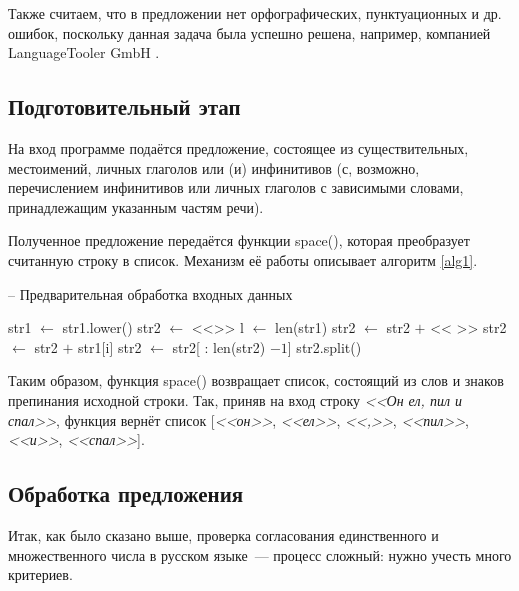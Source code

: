 \documentclass[main]{subfiles}
\begin{document}
Также считаем, что в предложении нет орфографических, пунктуационных и др. ошибок, поскольку данная задача была успешно решена, например, компанией LanguageTooler GmbH \cite{langt}.

\subsection{Подготовительный этап}
На вход программе подаётся предложение, состоящее из существительных, местоимений, личных глаголов или (и) инфинитивов (с, возможно, перечислением инфинитивов или личных глаголов с зависимыми словами, принадлежащим указанным частям речи). 

Полученное предложение передаётся функции space(), которая преобразует считанную строку в список. Механизм её работы описывает алгоритм \ref{alg1}.

\begin{algorithm}[!h]
	\caption{-- Предварительная обработка входных данных}\label{alg1}
	\begin{algorithmic}[1]
		\State str1 $\gets$ str1.lower() 
		\State str2 $\gets $ <<>> 
		\State l $\gets$ len(str1)
		\State str2 $\gets$ str2 $+$ << >>
		\EndIf
		\State str2 $\gets$ str2 $+$ str1$[$i$]$
		\EndFor
		\State str2 $\gets$ str2[ : len(str2) $- 1$] 
		\EndIf
		\State\Return str2.split() 
		\EndFunction
	\end{algorithmic}
\end{algorithm}

Таким образом, функция space() возвращает список, состоящий из слов и знаков препинания исходной строки. Так, приняв на вход строку \textit{<<Он ел, пил и спал>>}, функция вернёт список [\textit{<<он>>}, \textit{<<ел>>}, \textit{<<,>>}, \textit{<<пил>>}, \textit{<<и>>}, \textit{<<спал>>}].

\subsection{Обработка предложения}

Итак, как было сказано выше, проверка согласования единственного и множественного числа в русском языке~--- процесс сложный: нужно учесть много критериев. 
\end{document}
